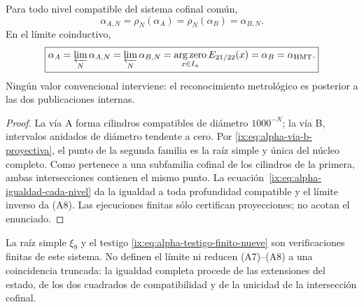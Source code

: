 \begin{theorem}
\label{ix:prop:alpha-dos-limites-historico-rev04}
Para todo nivel compatible del sistema cofinal común,
\begingroup
\renewcommand{\theequation}{A7}
\begin{equation}
 \boxed{\alpha_{A,N}=\rho_N(\alpha_A)
 =\rho_N(\alpha_B)=\alpha_{B,N}.}
 \label{ix:eq:alpha-dos-vias-cada-nivel-historico-rev04}
\end{equation}
\endgroup
En el límite coinductivo,
\begingroup
\renewcommand{\theequation}{A8}
\begin{equation}
 \boxed{\alpha_A
 =\varprojlim_N\alpha_{A,N}
 =\varprojlim_N\alpha_{B,N}
 =\operatorname*{arg\,zero}_{x\in I_\alpha}E_{21/22}(x)
 =\alpha_B=\alpha_{\mathrm{HMT}}.}
 \label{ix:eq:alpha-dos-vias-limite-coinductivo-historico-rev04}
\end{equation}
\endgroup
Ningún valor convencional interviene: el reconocimiento metrológico es
posterior a las dos publicaciones internas.
\end{theorem}

\begin{proof}
La vía A forma cilindros compatibles de diámetro \(1000^{-N}\); la vía B,
intervalos anidados de diámetro tendente a cero. Por
\eqref{ix:eq:alpha-via-b-proyectiva}, el punto de la segunda familia es la raíz
simple y única del núcleo completo. Como pertenece a una subfamilia cofinal
de los cilindros de la primera, ambas intersecciones contienen el mismo punto.
La ecuación~\eqref{ix:eq:alpha-igualdad-cada-nivel} da la igualdad a toda
profundidad compatible y el límite inverso da (A8). Las ejecuciones finitas
sólo certifican proyecciones; no acotan el enunciado.
\end{proof}

La raíz simple \(\xi_9\) y el testigo
\eqref{ix:eq:alpha-testigo-finito-nueve} son verificaciones finitas de este
sistema. No definen el límite ni reducen (A7)--(A8) a una coincidencia
truncada: la igualdad completa procede de las extensiones del estado, de los
dos cuadrados de compatibilidad y de la unicidad de la intersección cofinal.
